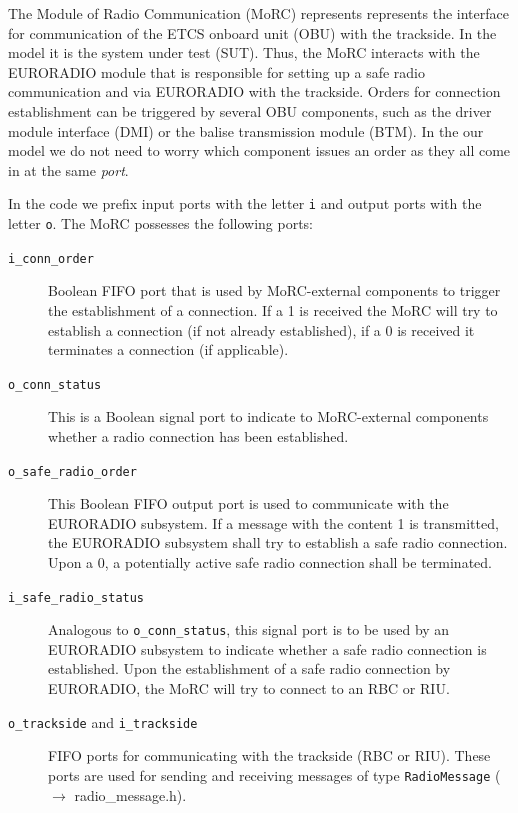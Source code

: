 \documentclass{template/openetcs_article}
\begin{document}
The Module of Radio Communication (MoRC) represents represents the interface for communication of the ETCS onboard unit (OBU) with the trackside. In the model it is the system under test (SUT). Thus, the MoRC interacts with the EURORADIO module that is responsible for setting up a safe radio communication and via EURORADIO with the trackside. Orders for connection establishment can be triggered by several OBU components, such as the driver module interface (DMI) or the balise transmission module (BTM). In the our model we do not need to worry which component issues an order as they all come in at the same \emph{port}.

In the code we prefix input ports with the letter \verb|i| and output ports with the letter \verb|o|. The MoRC possesses the following ports:
\begin{description}
  \item[\tt i\_conn\_order] Boolean FIFO port that is used by MoRC-external components to trigger the establishment of a connection. If a 1 is received the MoRC will try to establish a connection (if not already established), if a 0 is received it terminates a connection (if applicable).
  \item[\tt o\_conn\_status] This is a Boolean signal port to indicate to MoRC-external components whether a radio connection has been established.
  \item[\tt o\_safe\_radio\_order] This Boolean FIFO output port is used to communicate with the EURORADIO subsystem. If a message with the content 1 is transmitted, the EURORADIO subsystem shall try to establish a safe radio connection. Upon a 0, a potentially active safe radio connection shall be terminated.
  \item[\tt i\_safe\_radio\_status] Analogous to \texttt{o\_conn\_status}, this signal port is to be used by an EURORADIO subsystem to indicate whether a safe radio connection is established. Upon the establishment of a safe radio connection by EURORADIO, the MoRC will try to connect to an RBC or RIU.
  \item[{\tt o\_trackside} {\rm and }{\tt i\_trackside}] FIFO ports for communicating with the trackside (RBC or RIU). These ports are used for sending and receiving messages of type \verb|RadioMessage| ($\rightarrow$ radio\_message.h).
\end{description}
\end{document}
